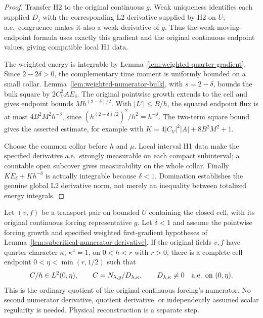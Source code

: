 \begin{proof}
\leanok
Transfer H2 to the original continuous $g$. Weak uniqueness identifies each
supplied $D_j$ with the corresponding L2 derivative supplied by H2 on $U$;
a.e.\ congruence makes it also a weak derivative of $g$.
Thus the weak moving-endpoint formula uses exactly this gradient and the
original continuous endpoint values, giving compatible local H1 data.

The weighted energy is integrable by
Lemma~\ref{lem:weighted-quarter-gradient}.
Since $2-2\delta>0$, the complementary time moment is uniformly bounded
on a small collar. Lemma~\ref{lem:weighted-numerator-bulk}, with
$s=2-\delta$, bounds the bulk square by $2C_V^2A E_\delta$.
The original pointwise growth extends to the cell and gives endpoint bounds
$Mh^{(2-\delta)/2}$. With $|L'|\le B/h$, the squared endpoint flux is
at most $4B^2M^2h^{-\delta}$, since
$(h^{(2-\delta)/2})^2/h^2=h^{-\delta}$.
The two-term square bound gives the asserted estimate, for example with
$K=4|C_V|^2|A|+8B^2M^2+1$.

Choose the common collar before $h$ and $\mu$. Local interval H1 data
make the specified derivative a.e.\ strongly measurable on each compact
subinterval; a countable open subcover gives measurability on the whole
collar. Finally $KE_\delta+Kh^{-\delta}$ is actually integrable because
$\delta<1$. Domination establishes the genuine global L2 derivative norm,
not merely an inequality between totalized energy integrals.
\end{proof}

\begin{lemma}
\label{lem:subcritical-quotient-mass}
\leanok
Let $(v,f)$ be a transport pair on bounded $U$ containing the closed cell,
with its original continuous forcing representative $g$.
Let $\delta<1$ and assume the pointwise forcing growth and specified
weighted first-gradient hypotheses of
Lemma~\ref{lem:subcritical-numerator-derivative}.
If the original fields $v,f$ have quarter character $\kappa$, $\kappa^4=1$,
on $0<h<r$ with $r>0$, there is a complete-cell endpoint
$0<\eta<\min(r,1/2)$ such that
\[
 C/h\in L^2(0,\eta),\qquad C=N_{\lambda,g}/D_{\lambda,\kappa},\qquad
 D_{\lambda,\kappa}\ne0\quad\hbox{a.e. on }(0,\eta).
\]
This is the ordinary quotient of the original continuous forcing's numerator.
No second numerator derivative, quotient derivative, or independently assumed
scalar regularity is needed. Physical reconstruction is a separate step.
\end{lemma}

